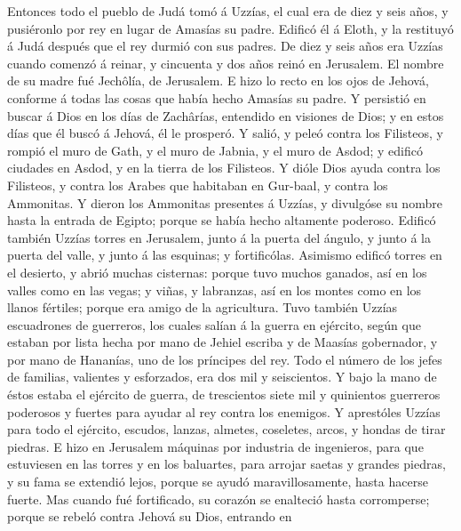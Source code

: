  Entonces todo el pueblo de Judá tomó á Uzzías, el cual
era de diez y seis años, y pusiéronlo por rey en lugar de Amasías su
padre.  Edificó él á Eloth, y la restituyó á Judá después
que el rey durmió con sus padres.  De diez y seis años era
Uzzías cuando comenzó á reinar, y cincuenta y dos años reinó en
Jerusalem. El nombre de su madre fué Jechôlía, de Jerusalem.
 E hizo lo recto en los ojos de Jehová, conforme á todas
las cosas que había hecho Amasías su padre.  Y persistió
en buscar á Dios en los días de Zachârías, entendido en visiones de
Dios; y en estos días que él buscó á Jehová, él le prosperó.
 Y salió, y peleó contra los Filisteos, y rompió el muro
de Gath, y el muro de Jabnia, y el muro de Asdod; y edificó ciudades en
Asdod, y en la tierra de los Filisteos.  Y dióle Dios
ayuda contra los Filisteos, y contra los Arabes que habitaban en
Gur-baal, y contra los Ammonitas.  Y dieron los Ammonitas
presentes á Uzzías, y divulgóse su nombre hasta la entrada de Egipto;
porque se había hecho altamente poderoso.  Edificó también
Uzzías torres en Jerusalem, junto á la puerta del ángulo, y junto á la
puerta del valle, y junto á las esquinas; y fortificólas.
 Asimismo edificó torres en el desierto, y abrió muchas
cisternas: porque tuvo muchos ganados, así en los valles como en las
vegas; y viñas, y labranzas, así en los montes como en los llanos
fértiles; porque era amigo de la agricultura.  Tuvo
también Uzzías escuadrones de guerreros, los cuales salían á la guerra
en ejército, según que estaban por lista hecha por mano de Jehiel
escriba y de Maasías gobernador, y por mano de Hananías, uno de los
príncipes del rey.  Todo el número de los jefes de
familias, valientes y esforzados, era dos mil y seiscientos.
 Y bajo la mano de éstos estaba el ejército de guerra, de
trescientos siete mil y quinientos guerreros poderosos y fuertes para
ayudar al rey contra los enemigos.  Y aprestóles Uzzías
para todo el ejército, escudos, lanzas, almetes, coseletes, arcos, y
hondas de tirar piedras.  E hizo en Jerusalem máquinas
por industria de ingenieros, para que estuviesen en las torres y en los
baluartes, para arrojar saetas y grandes piedras, y su fama se extendió
lejos, porque se ayudó maravillosamente, hasta hacerse fuerte.
 Mas cuando fué fortificado, su corazón se enalteció
hasta corromperse; porque se rebeló contra Jehová su Dios, entrando en
